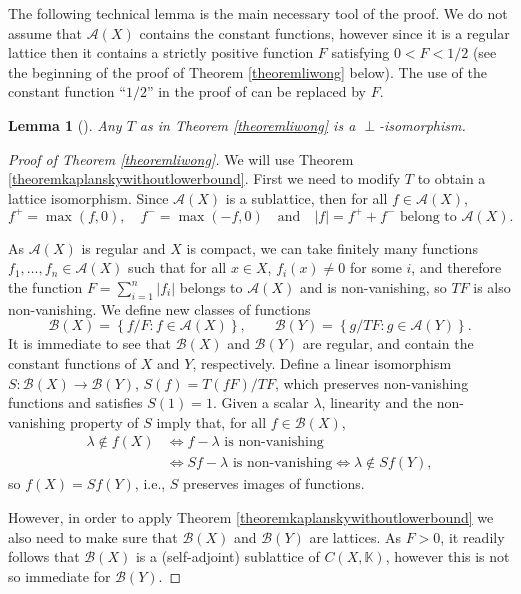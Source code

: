 \documentclass[letter,11pt]{amsart}
\theoremstyle{plain}		\newtheorem{theorem}[generalnumbering]{Theorem}
\theoremstyle{plain}		\newtheorem{corollary}[generalnumbering]{Corollary}
\theoremstyle{definition}		\newtheorem{definition}[generalnumbering]{Definition}
\theoremstyle{definition}		\newtheorem{example}[generalnumbering]{Example}
\theoremstyle{plain}		\newtheorem{proposition}[generalnumbering]{Proposition}
\theoremstyle{plain}		\newtheorem{lemma}[generalnumbering]{Lemma}
\theoremstyle{plain}    \newtheorem{plainstyle}[generalnumbering]{\namefordifferentenvironment}
\theoremstyle{plain}    \newtheorem*{plainstyle*}{\namefordifferentenvironment}
\theoremstyle{definition}    \newtheorem{definitionstyle}[generalnumbering]{\namefordifferentenvironment}
\theoremstyle{definition}    \newtheorem*{definitionstyle*}{\namefordifferentenvironment}
\begin{document}
The following technical lemma is the main necessary tool of the proof. We do not assume that $\mathcal{A}(X)$ contains the constant functions, however since it is a regular lattice then it contains a strictly positive function $F$ satisfying $0<F<1/2$ (see the beginning of the proof of Theorem \ref{theoremliwong} below). The use of the constant function ``$1/2$'' in the proof of \cite[Lemma 2.3]{MR3162258} can be replaced by $F$.

\begin{lemma}[{\cite[Lemma 2.3]{MR3162258}}]
	Any $T$ as in Theorem \ref{theoremliwong} is a $\perp$-isomorphism.
\end{lemma}

\begin{proof}[Proof of Theorem \ref{theoremliwong}]
	We will use Theorem \ref{theoremkaplanskywithoutlowerbound}. First we need to modify $T$ to obtain a lattice isomorphism. Since $\mathcal{A}(X)$ is a sublattice, then for all $f\in\mathcal{A}(X)$,
	\[f^+=\max(f,0),\quad f^-=\max(-f,0)\quad\text{and}\quad|f|=f^++f^-\text{ belong to }\mathcal{A}(X).\]
	
	As $\mathcal{A}(X)$ is regular and $X$ is compact, we can take finitely many functions $f_1,\ldots,f_n\in\mathcal{A}(X)$ such that for all $x\in X$, $f_i(x)\neq 0$ for some $i$, and therefore the function $F=\sum_{i=1}^n|f_i|$ belongs to $\mathcal{A}(X)$ and is non-vanishing, so $TF$ is also non-vanishing. We define new classes of functions
	\[\mathcal{B}(X)=\left\{f/F:f\in\mathcal{A}(X)\right\},\qquad\mathcal{B}(Y)=\left\{g/TF:g\in\mathcal{A}(Y)\right\}.\]
	It is immediate to see that $\mathcal{B}(X)$ and $\mathcal{B}(Y)$ are regular, and contain the constant functions of $X$ and $Y$, respectively. Define a linear isomorphism $S\colon \mathcal{B}(X)\to\mathcal{B}(Y)$, $S(f)=T(fF)/TF$, which preserves non-vanishing functions and satisfies $S(1)=1$. Given a scalar $\lambda$, linearity and the non-vanishing property of $S$ imply that, for all $f\in\mathcal{B}(X)$,
	\begin{align*}
	\lambda\not\in f(X)&\iff f-\lambda\text{ is non-vanishing}\\
	&\iff Sf-\lambda\text{ is non-vanishing}\iff \lambda\not\in Sf(Y),
	\end{align*}
	so $f(X)=Sf(Y)$, i.e., $S$ preserves images of functions.
	
	However, in order to apply Theorem \ref{theoremkaplanskywithoutlowerbound} we also need to make sure that $\mathcal{B}(X)$ and $\mathcal{B}(Y)$ are lattices. As $F>0$, it readily follows that $\mathcal{B}(X)$ is a (self-adjoint) sublattice of $C(X,\mathbb{K})$, however this is not so immediate for $\mathcal{B}(Y)$.
	

\end{proof}
\end{document}
